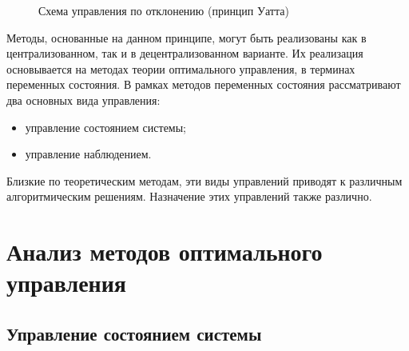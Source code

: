 \begin{figure}[!h]

\centering
{} 
\caption{Схема управления по отклонению (принцип Уатта)}
\label{fig:uatta}
\end{figure}

Методы, основанные на данном принципе, могут быть реализованы как в централизованном, так и в децентрализованном варианте.
Их реализация основывается на методах теории оптимального управления, в терминах переменных состояния.
В рамках методов переменных состояния рассматривают два основных вида управления:
\begin{itemize}
 \item управление состоянием системы;
 \item управление наблюдением.
\end{itemize}

Близкие по теоретическим методам, эти виды управлений приводят к различным алгоритмическим решениям.
Назначение этих управлений также различно.

\section{Анализ методов оптимального управления}

\subsection{Управление состоянием системы}


